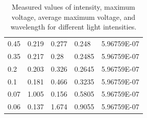 \documentclass[12pt,a4paper]{article}
\begin{document}
\begin{table}[H]
\begin{tabular}{lllll}
        0.45 & 0.219 & 0.277 & 0.248 & 5.96759E-07 \\ 
        0.35 & 0.217 & 0.28 & 0.2485 & 5.96759E-07 \\ 
        0.2 & 0.203 & 0.326 & 0.2645 & 5.96759E-07 \\ 
        0.1 & 0.181 & 0.466 & 0.3235 & 5.96759E-07 \\ 
        0.07 & 1.005 & 0.156 & 0.5805 & 5.96759E-07 \\ 
        0.06 & 0.137 & 1.674 & 0.9055 & 5.96759E-07 \\ \hline
    \end{tabular}
    \caption{Measured values of intensity, maximum voltage, average maximum voltage, and wavelength for different light intensities.}
    \label{tab:intensity_data}
\end{table}
\end{document}
